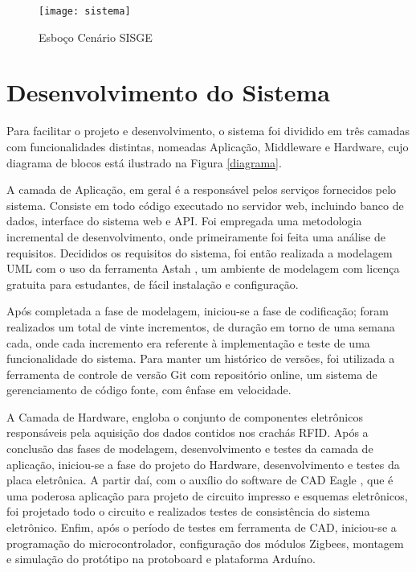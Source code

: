 \documentclass[tcc,capa]{texufpel}
\begin{document}
    \begin{figure}[H]
        \centering \texttt{[image: sistema]}
        \caption{Esboço Cenário SISGE} 
        \label{cenario}
    \end{figure}

    \section{Desenvolvimento do Sistema}
    
        Para facilitar o projeto e desenvolvimento, o sistema foi dividido em três camadas com funcionalidades distintas, nomeadas Aplicação, Middleware e Hardware, cujo diagrama de blocos está ilustrado na Figura \ref{diagrama}. 
        
        A camada de Aplicação, em geral é a responsável pelos serviços fornecidos pelo sistema. Consiste em todo código executado no servidor web, incluindo banco de dados, interface do sistema web e API. Foi empregada uma metodologia incremental de desenvolvimento, onde primeiramente foi feita uma análise de requisitos.  Decididos os requisitos do sistema, foi então realizada a modelagem UML com o uso da ferramenta Astah \cite{Astah:2015:Online}, um ambiente de modelagem  com licença gratuita para estudantes, de fácil instalação e configuração. 
         
        Após completada a fase de modelagem, iniciou-se a fase de codificação; foram realizados um total de vinte incrementos, de duração em torno de uma semana cada, onde cada incremento era referente à implementação e teste de uma funcionalidade do sistema. Para manter um histórico de versões, foi utilizada a ferramenta de controle de versão Git com repositório online, um sistema de gerenciamento de código fonte, com ênfase em velocidade.
        
        
        A Camada de Hardware, engloba o conjunto de componentes eletrônicos responsáveis pela aquisição dos dados contidos nos crachás RFID. Após a conclusão das fases de modelagem, desenvolvimento e testes da camada de aplicação, iniciou-se a fase do projeto do Hardware, desenvolvimento e testes da placa eletrônica. A partir daí, com o auxílio do software de CAD Eagle \cite{Eagle:2015:Online}, que é uma poderosa aplicação para projeto de circuito impresso e esquemas eletrônicos, foi projetado todo o circuito e realizados testes de consistência do sistema eletrônico. 
        Enfim, após o período de testes em ferramenta de CAD, iniciou-se a programação do microcontrolador, configuração dos módulos Zigbees, montagem e simulação do protótipo na protoboard e plataforma Arduíno.
        
\end{document}
